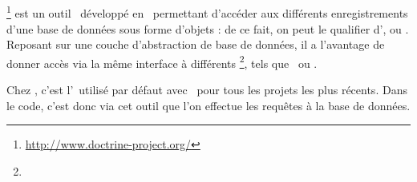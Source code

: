 \subsection{\adoctrine}
\label{section:outils_doctrine}

\adoctrine\footnote{\url{http://www.doctrine-project.org/}} est un outil \aos\ développé en \aphp\ permettant d'ac\-cé\-der aux différents enregistrements d'une base de données sous forme d'objets : de ce fait, on peut le qualifier d'\aorm, ou \aormfull. Reposant sur une couche d'abstraction de base de données, il a l'avantage de donner accès via la même interface à différents \asgbd\footnote{\asgbdfull}, tels que \amysql\ ou \apsql.

Chez \asl, c'est l'\aorm\ utilisé par défaut avec \asf\ pour tous les projets les plus récents. Dans le code, c'est donc via cet outil que l'on effectue les requêtes à la base de données.
